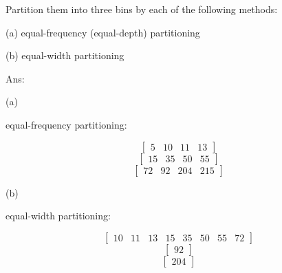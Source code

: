 	Partition them into three bins by each of the following methods:

	\begin{description}
		\item (a) equal-frequency (equal-depth) partitioning
		\item (b) equal-width partitioning
	\end{description}

	\vspace{0.5\baselineskip}

	Ans:

	\begin{description}
		\item (a)
		\item equal-frequency partitioning: 
	\end{description}

	$$
	\begin{bmatrix}
		5 & 10 & 11 & 13
	\end{bmatrix}
	$$
	$$
	\begin{bmatrix}
		15 & 35 & 50 & 55
	\end{bmatrix}
	$$
	$$
	\begin{bmatrix}
		72 & 92 & 204 & 215
	\end{bmatrix}
	$$

	\begin{description}
		\item (b)
		\item equal-width partitioning: 
	\end{description}

	$$
	\begin{bmatrix}
		10 & 11 & 13 & 15 & 35 & 50 & 55 & 72
	\end{bmatrix}
	$$
	$$
	\begin{bmatrix}
		92
	\end{bmatrix}
	$$
	$$
	\begin{bmatrix}
		204
	\end{bmatrix}
	$$


